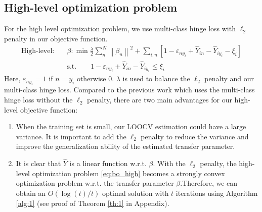 \subsection{High-level optimization problem} 
For the high level optimization problem, we use multi-class hinge loss \cite{crammer2002algorithmic} with $\ell_2$ penalty in our objective function.
\begin{equation}\label{eq:bo_high}
\begin{aligned}
\text{High-level:}\quad&\beta: \min \frac{{{\lambda}}}{2}\sum\limits_{n}^N {{{\left\| {{\beta _n}} \right\|}^2}}  + \sum\limits_{i,n}\left[ {1 - {\varepsilon _{n{y_i}}} + {{\hat Y}_{in}} - {{\hat Y}_{i{y_i}}} - {\xi _i}} \right]\\
&\text{s.t.} \qquad1 - {\varepsilon _{n{y_i}}} + {\hat Y_{in}} - {\hat Y_{i{y_i}}} \le {\xi_i}
\end{aligned}
\end{equation}
Here, $\varepsilon _{n{y_i}}=1$ if $n=y_i$ otherwise 0.
$\lambda$ is used to balance the $\ell_2$ penalty and our multi-class hinge loss. 
Compared to the previous work \cite{kuzborskij2013n,tommasi2014learning} which uses the multi-class hinge loss without the $\ell_2$ penalty, there are two main advantages for our high-level objective function: 
\begin{enumerate}
	\item When the training set is small, our LOOCV estimation could have a large variance. It is important to add the $\ell_2$ penalty to {reduce the variance and improve the generalization ability of the estimated transfer parameter}.
	\item It is clear that $\hat{Y}$ is a linear function w.r.t. $\beta$. With the $\ell_2$ penalty, the high-level optimization problem \eqref{eq:bo_high} becomes a strongly convex optimization problem w.r.t. the transfer parameter $\beta$.Therefore, we can obtain an $O({\log(t)}/{t})$ optimal solution with $t$ iterations using Algorithm \ref{alg:1} (see proof of Theorem \ref{th:1} in Appendix).
\end{enumerate}

 